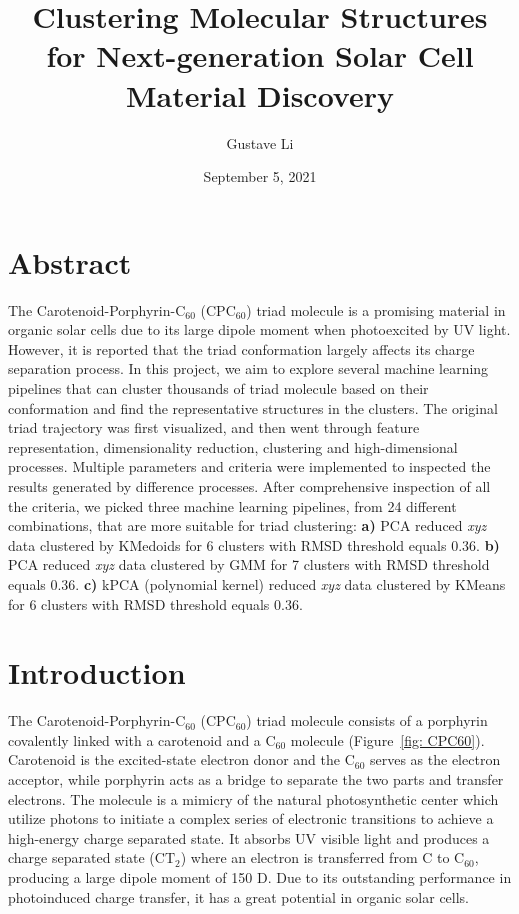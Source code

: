 \documentclass[a4paper]{article}
\title{Clustering Molecular Structures for Next-generation Solar Cell Material Discovery}
\author{Gustave Li}
\date{September 5, 2021}
\begin{document}
\maketitle

\section{Abstract}
The Carotenoid-Porphyrin-\(\text{C}_{60}\) (\(\text{CPC}_{60}\)) triad molecule is a promising material in organic solar cells due to its large dipole moment when photoexcited by UV light. However, it is reported that the triad conformation largely affects its charge separation process. In this project, we aim to explore several machine learning pipelines that can cluster thousands of triad molecule based on their conformation and find the representative structures in the clusters. The original triad trajectory was first visualized, and then went through feature representation, dimensionality reduction, clustering and high-dimensional processes. Multiple parameters and criteria were implemented to inspected the results generated by difference processes. After comprehensive inspection of all the criteria, we picked three machine learning pipelines, from 24 different combinations, that are more suitable for triad clustering: \textbf{a)} PCA reduced \textit{xyz} data clustered by KMedoids for 6 clusters with RMSD threshold equals 0.36. \textbf{b)} PCA reduced \textit{xyz} data clustered by GMM for 7 clusters with RMSD threshold equals 0.36. \textbf{c)} kPCA (polynomial kernel) reduced \textit{xyz} data clustered by KMeans for 6 clusters with RMSD threshold equals 0.36.

\section{Introduction}
The Carotenoid-Porphyrin-\(\text{C}_{60}\) (\(\text{CPC}_{60}\)) triad molecule consists of a porphyrin covalently linked with a carotenoid and a \(\text{C}_{60}\) molecule (Figure~\ref{fig: CPC60}). Carotenoid is the excited-state electron donor and the \(\text{C}_{60}\) serves as the electron acceptor, while porphyrin acts as a bridge to separate the two parts and transfer electrons. The molecule is a mimicry of the natural photosynthetic center which utilize photons to initiate a complex series of electronic transitions to achieve a high-energy charge separated state. It absorbs UV visible light and produces a charge separated state (\(\text{CT}_{2}\)) where an electron is transferred from C to \(\text{C}_{60}\), producing a large dipole moment of 150 D. Due to its outstanding performance in photoinduced charge transfer, it has a great potential in organic solar cells.
\end{document}
